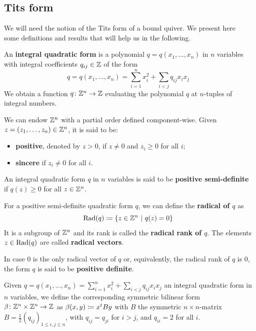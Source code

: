 
\subsection{Tits form}
We will need the notion of the Tits form of a bound quiver. We present here some definitions and results that will help us in the following.

\begin{definition}
	An \textbf{integral quadratic form} is a polynomial $q=q(x_1,\dots,x_n)$ in $n$ variables with integral coefficients $q_{ij}\in \mathbb{Z}$ of the form
	\[q=q(x_1,\dots,x_n)=\sum_{i=1}^{n} x_i^2 + \sum_{i<j} q_{ij} x_i x_j\]
	We obtain a function $q\colon\mathbb{Z}^n \to \mathbb{Z}$ evaluating the polynomial $q$ at $n$-tuples of integral numbers. 
	
	We can endow $\mathbb{Z}^n$ with a partial order defined component-wise. Given $z = (z_1,\dots,z_n) \in \mathbb{Z}^n$, it is said to be:
	\begin{itemize}
		\item \textbf{positive}, denoted by $z > 0$, if $z\neq 0$ and $z_i\geq0$ for all $i$;
		\item \textbf{sincere} if $z_i\neq 0$ for all $i$.
	\end{itemize}
	
	An integral quadratic form $q$ in $n$ variables is said to be \textbf{positive semi-definite} if $q(z)\geq 0$ for all $z\in\mathbb{Z}^n$.
	
	For a positive semi-definite quadratic form $q$, we can define the \textbf{radical of $q$} as 
	\[\operatorname{Rad}(q)\coloneqq \{z\in \mathbb{Z}^n\,\,\vert\,\, q(z) = 0\}\]
	It is a subgroup of $\mathbb{Z}^n$ and its rank is called the \textbf{radical rank of $q$}.
	The elements $z\in\operatorname{Rad}(q)$ are called \textbf{radical vectors}.
	
	In case $0$ is the only radical	vector of $q$ or, equivalently, the radical rank of $q$ is $0$, the form $q$ is said to be \textbf{positive definite}.
\end{definition}

\begin{definition}\label{def:quadmatrix}
	Given $q=q(x_1,\dots,x_n)=\sum_{i=1}^{n} x_i^2 + \sum_{i<j} q_{ij} x_i x_j$ an integral quadratic form in $n$ variables, we define the corresponding symmetric bilinear form $\beta\colon \mathbb{Z}^n \times \mathbb{Z}^n \to \mathbb{Z}$ as $\beta(x,y) \coloneqq x^t B y$ with $B$ the symmetric $n\times n$-matrix $B=\frac{1}{2}(q_{ij})_{1 \leq i,j \leq n}$, with $q_{ij}=q_{ji}$ for $i > j$, and $q_{ii} = 2$ for all $i$.	
\end{definition} 

